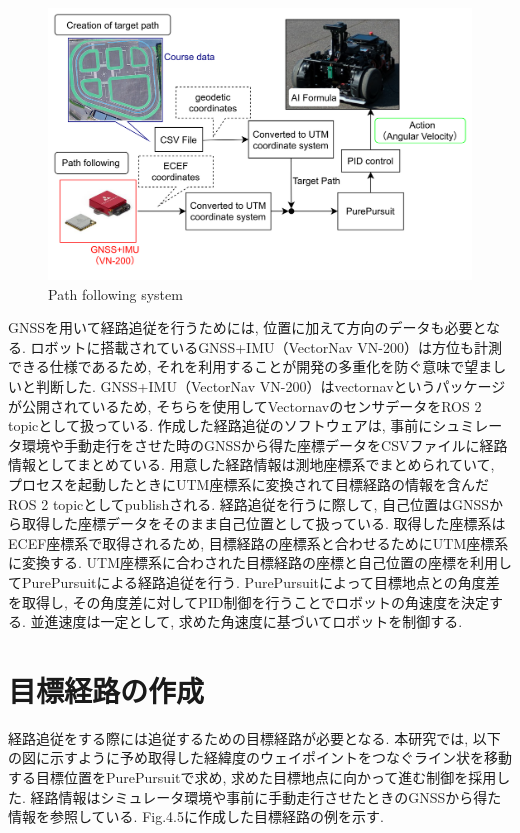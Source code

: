 \begin{figure}[H]
  \centering
 \includegraphics[keepaspectratio, scale=0.2]
      {images/system.png}
 \caption{Path following system}
 \label{fig:system}
\end{figure}

GNSSを用いて経路追従を行うためには, 位置に加えて方向のデータも必要となる.
ロボットに搭載されているGNSS+IMU（VectorNav VN-200）は方位も計測できる仕様であるため, それを利用することが開発の多重化を防ぐ意味で望ましいと判断した.
GNSS+IMU（VectorNav VN-200）はvectornav\cite{vectornav}というパッケージが公開されているため, そちらを使用してVectornavのセンサデータをROS 2 topicとして扱っている.
作成した経路追従のソフトウェアは, 事前にシュミレータ環境や手動走行をさせた時のGNSSから得た座標データをCSVファイルに経路情報としてまとめている.
用意した経路情報は測地座標系でまとめられていて, プロセスを起動したときにUTM座標系に変換されて目標経路の情報を含んだROS 2 topicとしてpublishされる.
経路追従を行うに際して, 自己位置はGNSSから取得した座標データをそのまま自己位置として扱っている.
取得した座標系はECEF座標系で取得されるため, 目標経路の座標系と合わせるためにUTM座標系に変換する.
UTM座標系に合わされた目標経路の座標と自己位置の座標を利用してPurePursuitによる経路追従を行う.
PurePursuitによって目標地点との角度差を取得し, その角度差に対してPID制御を行うことでロボットの角速度を決定する.
並進速度は一定として, 求めた角速度に基づいてロボットを制御する.

\section{目標経路の作成}
経路追従をする際には追従するための目標経路が必要となる.
本研究では, 以下の図に示すように予め取得した経緯度のウェイポイントをつなぐライン状を移動する目標位置をPurePursuitで求め, 求めた目標地点に向かって進む制御を採用した.
経路情報はシミュレータ環境や事前に手動走行させたときのGNSSから得た情報を参照している.
Fig.4.5に作成した目標経路の例を示す.

